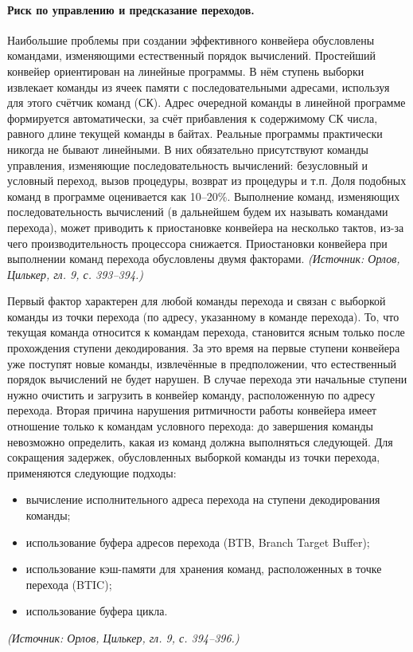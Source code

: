 \documentclass[a4paper,12pt]{article}
\begin{document}
\paragraph{Риск по управлению и предсказание переходов.}
Наибольшие проблемы при создании эффективного конвейера обусловлены командами, изменяющими естественный порядок вычислений. Простейший конвейер ориентирован на линейные программы. В нём ступень выборки извлекает команды из ячеек памяти с последовательными адресами, используя для этого счётчик команд (СК). Адрес очередной команды в линейной программе формируется автоматически, за счёт прибавления к содержимому СК числа, равного длине текущей команды в байтах. Реальные программы практически никогда не бывают линейными. В них обязательно присутствуют команды управления, изменяющие последовательность вычислений: безусловный и условный переход, вызов процедуры, возврат из процедуры и т.п. Доля подобных команд в программе оценивается как 10--20\%. Выполнение команд, изменяющих последовательность вычислений (в дальнейшем будем их называть командами перехода), может приводить к приостановке конвейера на несколько тактов, из-за чего производительность процессора снижается. Приостановки конвейера при выполнении команд перехода обусловлены двумя факторами.
\textit{(Источник: Орлов, Цилькер, гл. 9, с. 393--394.)}

Первый фактор характерен для любой команды перехода и связан с выборкой команды из точки перехода (по адресу, указанному в команде перехода). То, что текущая команда относится к командам перехода, становится ясным только после прохождения ступени декодирования. За это время на первые ступени конвейера уже поступят новые команды, извлечённые в предположении, что естественный порядок вычислений не будет нарушен. В случае перехода эти начальные ступени нужно очистить и загрузить в конвейер команду, расположенную по адресу перехода. Вторая причина нарушения ритмичности работы конвейера имеет отношение только к командам условного перехода: до завершения команды невозможно определить, какая из команд должна выполняться следующей. Для сокращения задержек, обусловленных выборкой команды из точки перехода, применяются следующие подходы:
\begin{itemize}
\item вычисление исполнительного адреса перехода на ступени декодирования команды;
\item использование буфера адресов перехода (BTB, Branch Target Buffer);
\item использование кэш-памяти для хранения команд, расположенных в точке перехода (BTIC);
\item использование буфера цикла.
\end{itemize}
\textit{(Источник: Орлов, Цилькер, гл. 9, с. 394--396.)}
\end{document}
